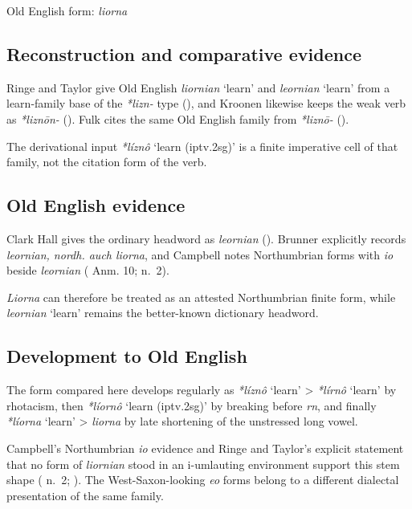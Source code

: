 \documentclass[
  british,
  a4paper,
  openany]{book}
\providecommand{\Recon}[1]{\emph{*#1}}
{\catcode`→=\active \global\def→{\ensuremath{\rightarrow}}}
\providecommand{\Recon}[1]{\emph{*#1}}
{\catcode`→=\active \global\def→{\ensuremath{\rightarrow}}}
\begin{document}
Old English form: \emph{liorna}

\subsection{Reconstruction and comparative
evidence}\label{reconstruction-and-comparative-evidence-130}

Ringe and Taylor give Old English {\emph{liornian}} `learn' and
{\emph{leornian}} `learn' from a learn-family base of the \emph{*lizn-}
type (), and
Kroonen likewise keeps the weak verb as \emph{*liznōn-}
(). Fulk cites the same Old
English family from \emph{*liznō-} ().

The derivational input {\Recon{líznô} `learn (iptv.2sg)'} is a finite
imperative cell of that family, not the citation form of the verb.

\subsection{Old English evidence}\label{old-english-evidence-130}

Clark Hall gives the ordinary headword as \emph{leornian}
(). Brunner explicitly
records \emph{leornian, nordh. auch liorna}, and Campbell notes
Northumbrian forms with \emph{io} beside \emph{leornian}
( Anm. 10;
 n.~2).

{\emph{Liorna}} can therefore be treated as an attested Northumbrian
finite form, while {\emph{leornian}} `learn' remains the better-known
dictionary headword.

\subsection{Development to Old
English}\label{development-to-old-english-130}

The form compared here develops regularly as \Recon{líznô} `learn'
\textgreater{} \Recon{lírnô} `learn' by rhotacism, then \Recon{líornô}
`learn (iptv.2sg)' by breaking before \emph{rn}, and finally
\Recon{líorna} `learn' \textgreater{} \emph{liorna} by late shortening
of the unstressed long vowel.

Campbell's Northumbrian \emph{io} evidence and Ringe and Taylor's
explicit statement that no form of \emph{liornian} stood in an
i-umlauting environment support this stem shape
( n.~2;
). The
West-Saxon-looking \emph{eo} forms belong to a different dialectal
presentation of the same family.
\end{document}

